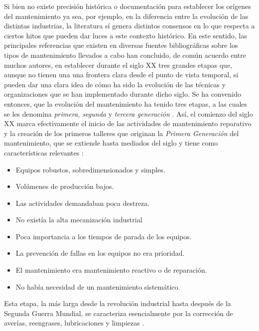 Si bien no existe precisión histórica o documentación para establecer los orígenes del mantenimiento ya sea, por ejemplo, en la diferencia entre la evolución de las distintas industrias, la literatura sí genera distintos consensos en lo que respecta a ciertos hitos que pueden dar luces a este contexto histórico. En este sentido, las principales referencias que existen en diversas fuentes bibliográficas sobre los tipos de mantenimiento llevados a cabo han concluido, de común acuerdo entre muchos autores, en establecer durante el siglo XX tres grandes etapas que, aunque no tienen una una frontera clara desde el punto de vista temporal, si pueden dar una clara idea de cómo ha sido la evolución de las técnicas y organizaciones que se han implementado durante dicho siglo. Se ha convenido entonces, que la evolución del mantenimiento ha tenido tres etapas, a las cuales se les denomina \textit{primera, segunda} y \textit{tercera generación} \citep{gonzalez2005}.
Así, el comienzo del siglo XX marca efectivamente el inicio de las actividades de mantenimiento reparativo y la creación de los primeros talleres que originan la \textit{Primera Generación} del mantenimiento, que se extiende hasta mediados del siglo y tiene como características relevantes \citep{garcia2012}:

\begin{itemize}
\item Equipos robustos, sobredimensionados y simples.
\item Volúmenes de producción bajos.
\item Las actividades demandaban poca destreza.
\item No existía la alta mecanización industrial
\item Poca importancia a los tiempos de parada de los equipos.
\item La prevención de fallas en los equipos no era prioridad.
\item El mantenimiento era mantenimiento reactivo o de reparación.
\item No había necesidad de un mantenimiento sistemático.
\end{itemize}  

Esta etapa, la más larga desde la revolución industrial hasta después de la Segunda Guerra Mundial, se caracteriza esencialmente por la corrección de averías, reengrases, lubricaciones y limpiezas \citep{gonzalez2005}.

